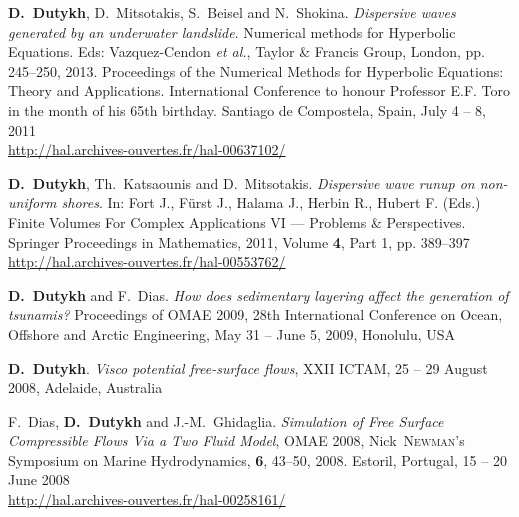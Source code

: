 \documentclass[final, a4paper, oneside, 12pt]{article}
\numberwithin{equation}{section}
\begin{document}
\begin{etaremune}


  \item \textbf{D.~Dutykh}, D.~Mitsotakis, S.~Beisel and N.~Shokina. \textit{Dispersive waves generated by an underwater landslide}. Numerical methods for Hyperbolic Equations. Eds: Vazquez-Cendon \emph{et al.}, Taylor \& Francis Group, London, pp. 245--250, 2013. Proceedings of the Numerical Methods for Hyperbolic Equations: Theory and Applications. International Conference to honour Professor E.F. Toro in the month of his 65th birthday. Santiago de Compostela, Spain, July 4 -- 8, 2011 \\ %
  \url{http://hal.archives-ouvertes.fr/hal-00637102/}

  \item \textbf{D.~Dutykh}, Th.~Katsaounis and D.~Mitsotakis. \textit{Dispersive wave runup on non-uniform shores}. In: Fort J., F\"urst J., Halama J., Herbin R., Hubert F. (Eds.) Finite Volumes For Complex Applications VI --- Problems \& Perspectives. Springer Proceedings in Mathematics, 2011, Volume \textbf{4}, Part 1, pp. 389--397 \\ %
  \url{http://hal.archives-ouvertes.fr/hal-00553762/}
  


  \item \textbf{D.~Dutykh} and F.~Dias. \textit{How does sedimentary layering affect the generation of tsunamis?} Proceedings of OMAE 2009, 28th International Conference on Ocean, Offshore and Arctic Engineering, May 31 -- June 5, 2009, Honolulu, USA %
  


  \item \textbf{D.~Dutykh}. \textit{Visco potential free-surface flows}, XXII ICTAM, 25 -- 29 August 2008, Adelaide, Australia %
  
  \item F.~Dias, \textbf{D.~Dutykh} and J.-M.~Ghidaglia. \textit{Simulation of Free Surface Compressible Flows Via a Two Fluid Model}, OMAE 2008, Nick~\textsc{Newman}'s Symposium on Marine Hydrodynamics, \textbf{6}, 43--50, 2008. Estoril, Portugal, 15 -- 20 June 2008 \\ %
  \url{http://hal.archives-ouvertes.fr/hal-00258161/}
  
\end{etaremune}
\end{document}

